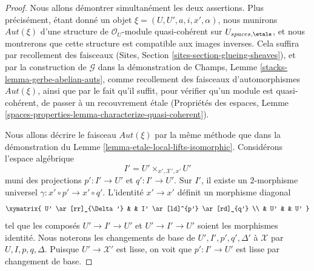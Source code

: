 \begin{proof}
Nous allons démontrer simultanément les deux assertions. Plus précisément, étant donné
un objet $\xi = (U, U', a, i, x', \alpha)$, nous munirons
$\mathit{Aut}(\xi)$ d'une structure de
$\mathcal{O}_U$-module quasi-cohérent sur $U_{spaces, \etale}$,
et nous montrerons que cette structure est compatible aux images inverses.
Cela suffira par recollement des faisceaux
(Sites, Section \ref{sites-section-glueing-sheaves}),
et par la construction de $\mathcal{G}$ dans la démonstration de
Champs, Lemme \ref{stacks-lemma-gerbe-abelian-auts},
comme recollement des faisceaux d'automorphismes $\mathit{Aut}(\xi)$,
ainsi que par le fait qu'il suffit, pour vérifier qu'un module est
quasi-cohérent, de passer à un recouvrement \'etale
(Propriétés des espaces, Lemme
\ref{spaces-properties-lemma-characterize-quasi-coherent}).

\medskip\noindent
Nous allons décrire le faisceau $\mathit{Aut}(\xi)$ par la
même méthode que dans la démonstration du
Lemme \ref{lemma-etale-local-lifts-isomorphic}.
Considérons l'espace algébrique
$$
I' = U' \times_{x', \mathcal{X}', x'} U'
$$
muni des projections $p' : I' \to U'$ et $q' : I' \to U'$.
Sur $I'$, il existe un $2$-morphisme universel
$\gamma : x' \circ p' \to x' \circ q'$.
L'identité $x' \to x'$ définit un morphisme diagonal
$$
\xymatrix{
U' \ar[rr]_{\Delta'} & & I' \ar[ld]^{p'} \ar[rd]_{q'} \\
& U' & & U'
}
$$
tel que les composés $U' \to I' \to U'$ et $U' \to I' \to U'$
soient les morphismes identité. Nous noterons les changements de base de
$U', I', p', q', \Delta'$ à $\mathcal{X}$ par $U, I, p, q, \Delta$.
Puisque $U' \to \mathcal{X}'$ est lisse, on voit que $p' : I' \to U'$
est lisse par changement de base.


\end{proof}
